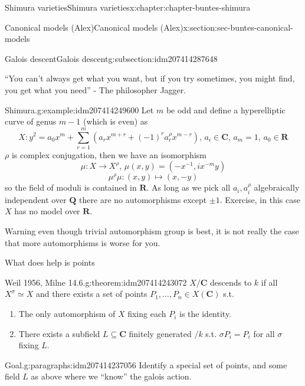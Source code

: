 \documentclass[oneside,10pt,]{book}
\numberwithin{equation}{section}
\newcommand{\inv}{^{-1}}
\newcommand{\QQ}{\mathbf{Q}}
\newcommand{\RR}{\mathbf{R}}
\newcommand{\CC}{\mathbf{C}}
\begin{document}
\begin{chapterptx}{Shimura varieties}{}{Shimura varieties}{}{}{x:chapter:chapter-buntes-shimura}
\begin{sectionptx}{Canonical models (Alex)}{}{Canonical models (Alex)}{}{}{x:section:sec-buntes-canonical-models}
\begin{subsectionptx}{Galois descent}{}{Galois descent}{}{}{g:subsection:idm207414287648}
\par
``You can't always get what you want, but if you try sometimes, you might find, you get what you need'' - The philosopher Jagger.%
\begin{example}{Shimura.}{g:example:idm207414249600}%
Let \(m\) be odd and define a hyperelliptic curve of genus \(m - 1\) (which is even) as%
\begin{equation*}
X\colon y^2 = a_0 x^m + \sum_{r= 1}^m (a_r x^{m+r} + (-1)^r a_r^\rho x^{m-r}),\,a_i \in \CC,\,a_m = 1,\,a_0 \in \RR
\end{equation*}
\(\rho\) is complex conjugation, then we have an isomorphism%
\begin{equation*}
\mu\colon X \to X^\rho,\,\mu(x,y) = (-x\inv, i x^{-m} y)
\end{equation*}
%
\begin{equation*}
\mu^\rho \mu \colon (x,y)\mapsto (x,-y)
\end{equation*}
so the field of moduli is contained in \(\RR\). As long as we pick all \(a_i,a_i^\rho\) algebraically independent over \(\QQ\) there are no automorphisms except \(\pm 1\). Exercise, in this case \(X\) has no model over \(\RR\).%
\end{example}
Warning even though trivial automorphism group is best, it is not really the case that more automorphisms is worse for you.%
\par
What does help is points%
\begin{theorem}{Weil 1956, Milne 14.6.}{}{g:theorem:idm207414243072}%
\(X/\CC\) descends to \(k\) if all \(X^\sigma \simeq X\) and there exists a set of points \(P_1,\ldots, P_n\in  X(\CC)\) s.t.%
\begin{enumerate}
\item{}The only automorphism of \(X\) fixing each \(P_i\) is the identity.%
\item{}There exists a subfield \(L \subseteq \CC\) finitely generated \(/k\) s.t. \(\sigma P_i = P_i\) for all \(\sigma\) fixing \(L\).%
\end{enumerate}
%
\end{theorem}
\begin{paragraphs}{Goal.}{g:paragraphs:idm207414237056}%
Identify a special set of points, and some field \(L\) as above where we ``know'' the galois action.%
\end{paragraphs}%
\end{subsectionptx}
%
%
\typeout{************************************************}
\typeout{************************************************}

\end{sectionptx}
\end{chapterptx}
\end{document}

